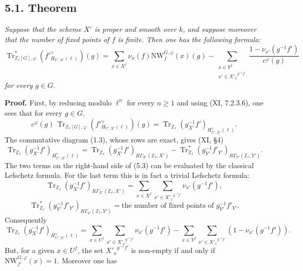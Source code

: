 \documentclass[11pt]{article}
\providecommand{\Tr}{\operatorname{Tr}}
\providecommand{\Tr}{\operatorname{Tr}}
\providecommand{\Tr}{\operatorname{Tr}}
\providecommand{\Tr}{\operatorname{Tr}}
\providecommand{\bZ}{\mathbb Z}
\providecommand{\Tr}{\operatorname{Tr}}
\begin{document}
\subsection*{5.1. Theorem}
\emph{Suppose that the scheme $X'$ is proper and smooth over $k$, and suppose moreover that the number of fixed points of $f$ is finite. Then one has the following formula:
\begin{equation}\tag{5.1.1}
\Tr^*_{\bZ_\ell[G],\varphi}(f'^\vee_{H_{U',X'}(\ell)})(g)
=
\sum_{x\in X^f}\nu_x(f)\mathrm{NW}_f^{G,\varphi}(x)(g)
-
\sum_{\substack{x\in Y^f\\ x'\in {X'_x}^{g^{-1}f'}}}
\frac{1-\nu_{x'}(g^{-1}f')}{c^\varphi(g)}
\end{equation}
for every $g\in G$.}

\bigskip
\noindent
\textbf{Proof.} First, by reducing modulo $\ell^n$ for every $n\ge1$ and using (XI, 7.2.3.6), one sees that for every $g\in G$,
\begin{equation}\tag{5.2}
c^\varphi(g)\,\Tr_{\bZ_\ell[G],\varphi}(f'^\vee_{H_{U',X'}(\ell)})(g)
=
\Tr_{\bZ_\ell}(g^{-1}_{X'}f')_{H^\vee_{U',X'}(\ell)}.
\end{equation}
The commutative diagram (1.3), whose rows are exact, gives (XI, \S4)
\begin{equation}\tag{5.3}
\Tr_{\bZ_\ell}(g^{-1}_{X'}f')_{H^\vee_{U',X'}(\ell)}
=
\Tr_{\bZ_\ell}(g^{-1}_{X'}f')_{R\Gamma_{X'}(\bZ_\ell,X')}
-
\Tr^*_{\bZ_\ell}(g^{-1}_{Y'}f'_{Y'})_{R\Gamma_{Y'}(\bZ_\ell,Y')}.
\end{equation}
The two terms on the right-hand side of (5.3) can be evaluated by the classical Lefschetz formula. For the last term this is in fact a trivial Lefschetz formula:
\begin{equation}\tag{5.4}
\Tr_{\bZ_\ell}(g^{-1}_{X'}f')_{R\Gamma_{X'}(\bZ_\ell,X')}
=
\sum_{x\in X^f}\sum_{x'\in {X'_x}^{g^{-1}f'}}\nu_{x'}(g^{-1}f'),
\end{equation}
\begin{equation}\tag{5.5}
\Tr^*_{\bZ_\ell}(g^{-1}_{Y'}f'_{Y'})_{R\Gamma_{Y'}(\bZ_\ell,Y')}
=
\text{the number of fixed points of }g^{-1}_{Y'}f'_{Y'}.
\end{equation}
Consequently
\begin{equation}\tag{5.6}
\Tr_{\bZ_\ell}(g^{-1}_{X'}f')_{H^\vee_{U',X'}(\ell)}
=
\sum_{x\in U^f}\sum_{x'\in {X'_x}^{g^{-1}f'}}\nu_{x'}(g^{-1}f')
-
\sum_{x\in Y^f}\sum_{x'\in {X'_x}^{g^{-1}f'}}(1-\nu_{x'}(g^{-1}f')).
\end{equation}
But, for a given $x\in U^f$, the set ${X'_x}^{g^{-1}f'}$ is non-empty if and only if $\mathrm{NW}_{f'}^{G,\varphi}(x)=1$. Moreover one has
\end{document}
